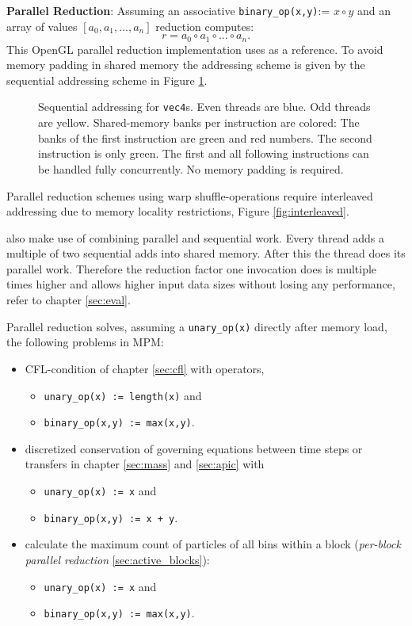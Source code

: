\documentclass[m,times]{cgMA}
\begin{document}
\textbf{Parallel Reduction}: Assuming an associative \texttt{binary\_op(x,y)}:= $x \circ y$ and an array of values $\left[a_0,a_1, ... ,a_n\right]$ reduction computes:
\begin{equation}
  r = a_0 \circ a_1 \circ ... \circ a_n.
\end{equation}
This OpenGL parallel reduction implementation uses \cite{NVIDIA:PARALLEL_REDUCTION} as a reference. To avoid memory padding in shared memory the addressing scheme is given by the sequential addressing scheme in Figure \ref{fig:sequential}.
\begin{figure}[htbp]
    \centering
  
  \caption{Sequential addressing for \texttt{vec4}s. Even threads are blue. Odd threads are yellow. Shared-memory banks per instruction are colored: The banks of the first instruction are green and red numbers. The second instruction is only green. The first and all following instructions can be handled fully concurrently. No memory padding is required.}
\label{fig:sequential}
\end{figure}

Parallel reduction schemes using warp shuffle-operations require interleaved addressing due to memory locality restrictions, Figure \ref{fig:interleaved}. \cite{NVIDIA:SHUFFLE}

\cite{NVIDIA:PARALLEL_REDUCTION} also make use of combining parallel and sequential work. Every thread adds a multiple of two sequential adds into shared memory. After this the thread does its parallel work. Therefore the reduction factor one invocation does is multiple times higher and allows higher input data sizes without losing any performance, refer to chapter \ref{sec:eval}.

Parallel reduction solves, assuming a \texttt{unary\_op(x)} directly after memory load, the following problems in MPM:
\begin{itemize}
  \item CFL-condition of chapter \ref{sec:cfl} with operators,
  \begin{itemize}
  \item \texttt{unary\_op(x) := length(x)} and
  \item \texttt{binary\_op(x,y) := max(x,y)}.
  \end{itemize}
\item discretized conservation of governing equations between time steps or transfers in chapter \ref{sec:mass} and \ref{sec:apic} with
\begin{itemize}
  \item \texttt{unary\_op(x) := x} and
  \item \texttt{binary\_op(x,y) := x + y}.
  \end{itemize}
\item calculate the maximum count of particles of all bins within a block (\textit{per-block parallel reduction} \ref{sec:active_blocks}):
\begin{itemize}
  \item \texttt{unary\_op(x) := x} and
  \item \texttt{binary\_op(x,y) := max(x,y)}.
\end{itemize}
\end{itemize}
\end{document}

